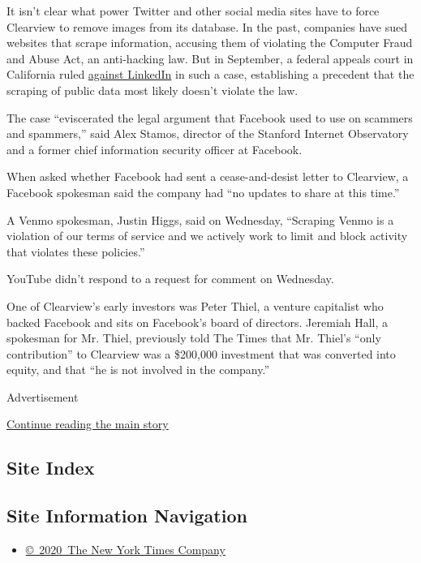 It isn't clear what power Twitter and other social media sites have to
force Clearview to remove images from its database. In the past,
companies have sued websites that scrape information, accusing them of
violating the Computer Fraud and Abuse Act, an anti-hacking law. But in
September, a federal appeals court in California ruled
\href{https://www.eff.org/deeplinks/2019/09/victory-ruling-hiq-v-linkedin-protects-scraping-public-data}{against
LinkedIn} in such a case, establishing a precedent that the scraping of
public data most likely doesn't violate the law.

The case ``eviscerated the legal argument that Facebook used to use on
scammers and spammers,'' said Alex Stamos, director of the Stanford
Internet Observatory and a former chief information security officer at
Facebook.

When asked whether Facebook had sent a cease-and-desist letter to
Clearview, a Facebook spokesman said the company had ``no updates to
share at this time.''

A Venmo spokesman, Justin Higgs, said on Wednesday, ``Scraping Venmo is
a violation of our terms of service and we actively work to limit and
block activity that violates these policies.''

YouTube didn't respond to a request for comment on Wednesday.

One of Clearview's early investors was Peter Thiel, a venture capitalist
who backed Facebook and sits on Facebook's board of directors. Jeremiah
Hall, a spokesman for Mr. Thiel, previously told The Times that Mr.
Thiel's ``only contribution'' to Clearview was a \$200,000 investment
that was converted into equity, and that ``he is not involved in the
company.''

Advertisement

\protect\hyperlink{after-bottom}{Continue reading the main story}

\hypertarget{site-index}{%
\subsection{Site Index}\label{site-index}}

\hypertarget{site-information-navigation}{%
\subsection{Site Information
Navigation}\label{site-information-navigation}}

\begin{itemize}
\tightlist
\item
  \href{https://help.nytimes3xbfgragh.onion/hc/en-us/articles/115014792127-Copyright-notice}{©~2020~The
  New York Times Company}
\end{itemize}

